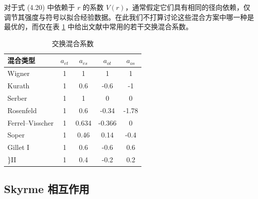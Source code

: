 对于式 (4.20) 中依赖于 $r$ 的系数 $V(r)$，通常假定它们具有相同的径向依赖，仅调节其强度与符号以拟合经验数据。在此我们不打算讨论这些混合方案中哪一种是最优的，而仅在表
\ref{tab:=004EA4=006362=006DF7=005408=007CFB=006570} 中给出文献中常用的若干交换混合系数。

\begin{table}[H]
\begin{centering}
\caption{\label{tab:=004EA4=006362=006DF7=005408=007CFB=006570}交换混合系数}
\par\end{centering}
\centering{}%
\begin{tabular}{lcccc}
\hline 
混合类型 & $a_{et}$ & $a_{es}$ & $a_{ot}$ & $a_{os}$\tabularnewline
\hline 
Wigner & 1 & 1 & 1 & 1\tabularnewline
Kurath \cite{Ku56,SW66} & 1 & 0.6 & -0.6 & -1\tabularnewline
Serber \cite{HS57} & 1 & 1 & 0 & 0\tabularnewline
Rosenfeld \cite{EF57} & 1 & 0.6 & -0.34 & -1.78\tabularnewline
Ferrel–Visscher \cite{VF57} & 1 & 0.634 & -0.366 & 0\tabularnewline
Soper \cite{So57} & 1 & 0.46 & 0.14 & -0.4\tabularnewline
Gillet \cite{GGS66} I & 1 & 0.6 & -0.6 & 0.6\tabularnewline
\cite{GGS66} \}II & 1 & 0.4 & -0.2 & 0.2\tabularnewline
\hline 
\end{tabular}
\end{table}


\subsection{Skyrme 相互作用}

